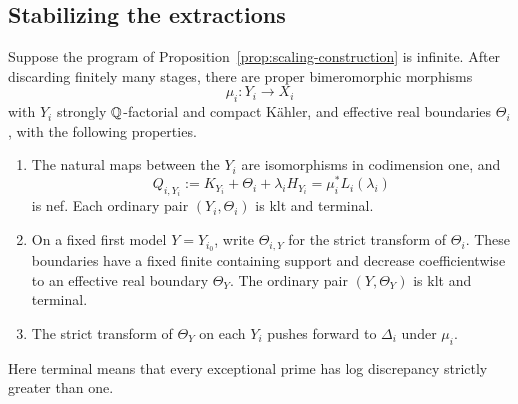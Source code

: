 \subsection{Stabilizing the extractions}

\begin{proposition}\label{prop:terminal-limit}
Suppose the program of Proposition~\ref{prop:scaling-construction} is
infinite.  After discarding finitely many stages, there are proper
bimeromorphic morphisms
\[
 \mu_i:Y_i\longrightarrow X_i
\]
with \(Y_i\) strongly \(\mathbb Q\)-factorial and compact Kähler, and
effective real boundaries \(\Theta_i\), with the following properties.
\begin{enumerate}[label=\textup{(\roman*)}]
\item The natural maps between the \(Y_i\) are isomorphisms in
codimension one, and
\begin{equation}\label{eq:extracted-nef-adjoint}
 Q_{i,Y_i}:=K_{Y_i}+\Theta_i+\lambda_iH_{Y_i}
       =\mu_i^*L_i(\lambda_i)
\end{equation}
is nef.  Each ordinary pair \((Y_i,\Theta_i)\) is klt and terminal.
\item On a fixed first model \(Y=Y_{i_0}\), write
\(\Theta_{i,Y}\) for the strict transform of \(\Theta_i\).
These boundaries have a fixed finite containing support and decrease
coefficientwise to an effective real boundary \(\Theta_Y\).
The ordinary pair \((Y,\Theta_Y)\) is klt and terminal.
\item The strict transform of \(\Theta_Y\) on each \(Y_i\)
pushes forward to \(\Delta_i\) under \(\mu_i\).
\end{enumerate}
Here terminal means that every exceptional prime has log discrepancy
strictly greater than one.
\end{proposition}

